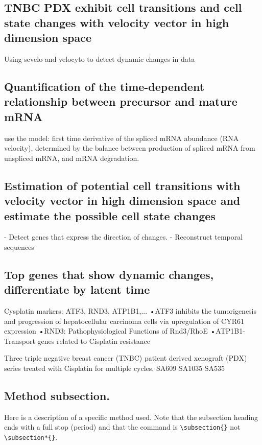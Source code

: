 \documentclass{nature}
\begin{document}
\subsection{TNBC PDX exhibit cell transitions and cell state changes with velocity vector in high dimension space}

Using scvelo and velocyto to detect dynamic
changes in data
\subsection{Quantification of the time-dependent relationship between precursor and mature mRNA}
use the model: first time derivative of the spliced mRNA abundance (RNA velocity), determined by the
balance between production of spliced mRNA from unspliced mRNA, and mRNA degradation.

\subsection{Estimation of potential cell transitions with velocity vector in high dimension space and estimate the possible cell state changes }
- Detect genes that express the direction of changes.
- Reconstruct temporal sequences

\subsection{Top genes that show dynamic changes, differentiate by latent time} 
Cysplatin markers: ATF3, RND3, ATP1B1,...
•ATF3 inhibits the tumorigenesis and progression of hepatocellular carcinoma cells via upregulation of CYR61 expression
•RND3: Pathophysiological Functions of Rnd3/RhoE
•ATP1B1-Transport genes related to Cisplatin resistance




\begin{methods}
Three triple negative breast cancer (TNBC) patient derived xenograft (PDX) series treated with Cisplatin for multiple cycles.
SA609 
SA1035
SA535

\subsection{Method subsection.}

Here is a description of a specific method used.  Note that the
subsection heading ends with a full stop (period) and that the
command is \verb|\subsection{}| not \verb|\subsection*{}|.

\end{methods}
\end{document}
